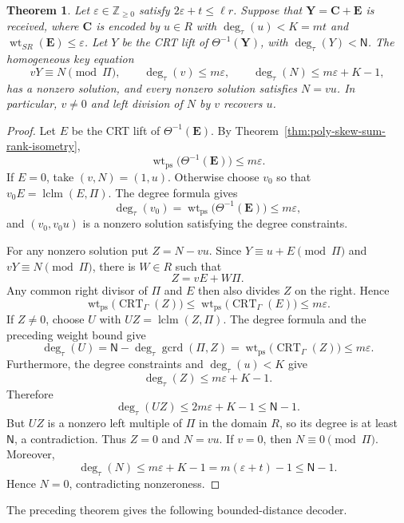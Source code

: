 \documentclass[10pt,a4paper]{amsart}
\DeclareMathOperator{\wt}{wt}
\theoremstyle{definition}
\theoremstyle{plain}
\newtheorem{theorem}[definition]{Theorem}
\theoremstyle{remark}
\renewcommand{\epsilon}{\varepsilon}
\begin{document}
\begin{theorem}
\label{thm:drinfeld-skew-crt-decoder}
Let $\epsilon\in\mathbb Z_{\geq 0}$ satisfy
$2\epsilon+t\leq\ell r$. Suppose that
$\boldsymbol Y=\boldsymbol C+\boldsymbol E$ is received, where
$\boldsymbol C$ is encoded by $u\in R$ with
$\deg_\tau(u)<K=mt$ and
$\wt_{SR}(\boldsymbol E)\leq\epsilon$. Let $Y$ be the CRT lift of
$\Theta^{-1}(\boldsymbol Y)$, with $\deg_\tau(Y)<\mathsf N$. The homogeneous
key equation
$$
vY\equiv N\pmod{\Pi},
\qquad
\deg_\tau(v)\leq m\epsilon,
\qquad
\deg_\tau(N)\leq m\epsilon+K-1,
$$
has a nonzero solution, and every nonzero solution satisfies $N=vu$. In
particular, $v\neq0$ and left division of $N$ by $v$ recovers $u$.
\end{theorem}

\begin{proof}
Let $E$ be the CRT lift of $\Theta^{-1}(\boldsymbol E)$. By
Theorem~\ref{thm:poly-skew-sum-rank-isometry},
$$
\wt_{\mathrm{ps}}\bigl(\Theta^{-1}(\boldsymbol E)\bigr)
\leq m\epsilon.
$$
If $E=0$, take $(v,N)=(1,u)$. Otherwise choose $v_0$ so that
$v_0E=\operatorname{lclm}(E,\Pi)$. The degree formula gives
$$
\deg_\tau(v_0)
=
\wt_{\mathrm{ps}}\bigl(\Theta^{-1}(\boldsymbol E)\bigr)
\leq m\epsilon,
$$
and $(v_0,v_0u)$ is a nonzero solution satisfying the degree constraints.

For any nonzero solution put $Z=N-vu$. Since
$Y\equiv u+E\pmod{\Pi}$ and $vY\equiv N\pmod{\Pi}$, there is $W\in R$
such that
$$
Z=vE+W\Pi.
$$
Any common right divisor of $\Pi$ and $E$ then also divides $Z$ on the
right. Hence
$$
\wt_{\mathrm{ps}}\bigl(\operatorname{CRT}_\Gamma(Z)\bigr)
\leq
\wt_{\mathrm{ps}}\bigl(\operatorname{CRT}_\Gamma(E)\bigr)
\leq m\epsilon.
$$
If $Z\neq0$, choose $U$ with
$UZ=\operatorname{lclm}(Z,\Pi)$. The degree formula and the preceding weight
bound give
$$
\deg_\tau(U)
=
\mathsf N-\deg_\tau\operatorname{gcrd}(\Pi,Z)
=
\wt_{\mathrm{ps}}\bigl(\operatorname{CRT}_\Gamma(Z)\bigr)
\leq m\epsilon.
$$
Furthermore, the degree constraints and $\deg_\tau(u)<K$ give
$$
\deg_\tau(Z)
\leq
m\epsilon+K-1.
$$
Therefore
$$
\deg_\tau(UZ)
\leq
2m\epsilon+K-1
\leq
\mathsf N-1.
$$
But $UZ$ is a nonzero left multiple of $\Pi$ in the domain $R$, so its
degree is at least $\mathsf N$, a contradiction. Thus $Z=0$ and $N=vu$.
If $v=0$, then $N\equiv0\pmod{\Pi}$. Moreover,
$$
\deg_\tau(N)
\leq m\epsilon+K-1
=
m(\epsilon+t)-1
\leq
\mathsf N-1.
$$
Hence $N=0$, contradicting nonzeroness.
\end{proof}

The preceding theorem gives the following bounded-distance decoder.
\end{document}
